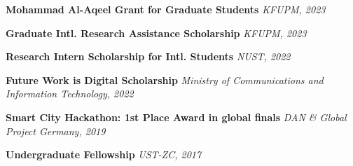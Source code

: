 \textbf{Mohammad Al-Aqeel Grant for Graduate Students} \hfill{\textit{KFUPM, 2023}}

\textbf{Graduate Intl. Research Assistance Scholarship} \hfill {\textit{KFUPM, 2023}}

\textbf{Research Intern Scholarship for Intl. Students} \hfill \textit{NUST, 2022}

\textbf{Future Work is Digital Scholarship} \hfill {\textit{Ministry of Communications and Information Technology, 2022}}

\textbf{Smart City Hackathon: 1st Place Award in global finals} \hfill {\textit{DAN \& Global Project Germany, 2019}}

\textbf{Undergraduate Fellowship} \hfill {\textit{UST-ZC, 2017}}